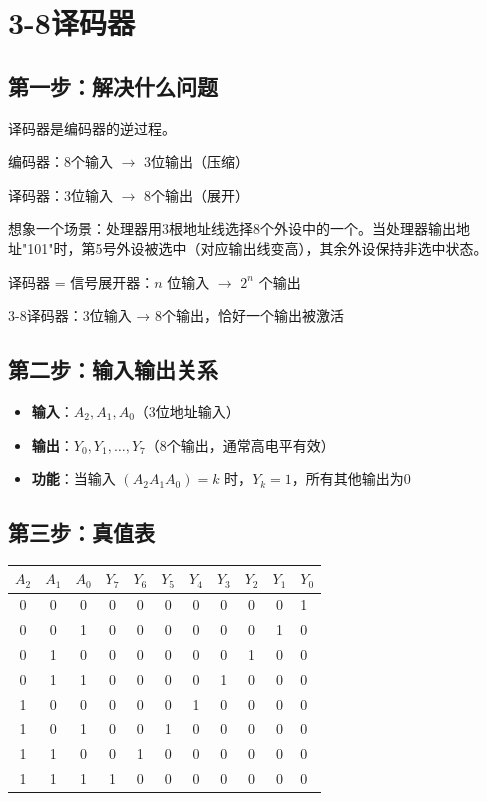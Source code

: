 \chapter{3-8译码器}

\section{第一步：解决什么问题}

译码器是编码器的逆过程。

编码器：8个输入 $\to$ 3位输出（压缩）

译码器：3位输入 $\to$ 8个输出（展开）

想象一个场景：处理器用3根地址线选择8个外设中的一个。当处理器输出地址"101"时，第5号外设被选中（对应输出线变高），其余外设保持非选中状态。

\begin{keypoint}[译码器的本质]
译码器 = 信号展开器：$n$ 位输入 $\to$ $2^n$ 个输出

3-8译码器：3位输入 → 8个输出，恰好一个输出被激活
\end{keypoint}

\section{第二步：输入输出关系}

\begin{itemize}
  \item \textbf{输入}：$A_2, A_1, A_0$（3位地址输入）
  \item \textbf{输出}：$Y_0, Y_1, \dots, Y_7$（8个输出，通常高电平有效）
  \item \textbf{功能}：当输入 $(A_2 A_1 A_0) = k$ 时，$Y_k = 1$，所有其他输出为0
\end{itemize}

\section{第三步：真值表}

\begin{center}
\begin{tabular}{|c|c|c|c|c|c|c|c|c|c|}
\hline
$A_2$ & $A_1$ & $A_0$ & $Y_7$ & $Y_6$ & $Y_5$ & $Y_4$ & $Y_3$ & $Y_2$ & $Y_1$ & $Y_0$ \\
 & 0 & 0 & 0 & 0 & 0 & 0 & 0 & 0 & 0 & 1 \\
0 & 0 & 1 & 0 & 0 & 0 & 0 & 0 & 0 & 1 & 0 \\
0 & 1 & 0 & 0 & 0 & 0 & 0 & 0 & 1 & 0 & 0 \\
0 & 1 & 1 & 0 & 0 & 0 & 0 & 1 & 0 & 0 & 0 \\
1 & 0 & 0 & 0 & 0 & 0 & 1 & 0 & 0 & 0 & 0 \\
1 & 0 & 1 & 0 & 0 & 1 & 0 & 0 & 0 & 0 & 0 \\
1 & 1 & 0 & 0 & 1 & 0 & 0 & 0 & 0 & 0 & 0 \\
1 & 1 & 1 & 1 & 0 & 0 & 0 & 0 & 0 & 0 & 0 \\
\hline
\end{tabular}
\end{center}


